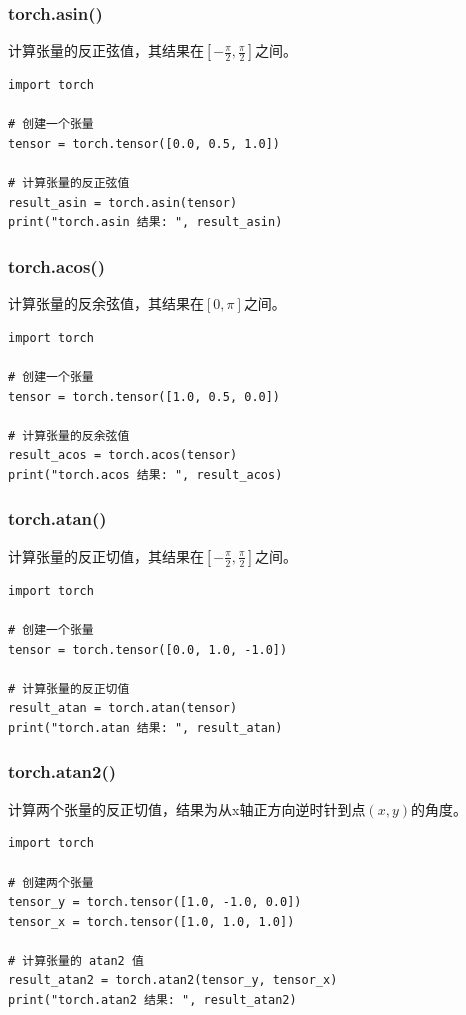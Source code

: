 \subsubsection{torch.asin()}
计算张量的反正弦值，其结果在$[-\frac{\pi}{2}, \frac{\pi}{2}]$之间。
\begin{lstlisting}[style=pythonstyle]
import torch

# 创建一个张量
tensor = torch.tensor([0.0, 0.5, 1.0])

# 计算张量的反正弦值
result_asin = torch.asin(tensor)
print("torch.asin 结果: ", result_asin)
\end{lstlisting}

\subsubsection{torch.acos()}
计算张量的反余弦值，其结果在$[0, \pi]$之间。
\begin{lstlisting}[style=pythonstyle]
import torch

# 创建一个张量
tensor = torch.tensor([1.0, 0.5, 0.0])

# 计算张量的反余弦值
result_acos = torch.acos(tensor)
print("torch.acos 结果: ", result_acos)
\end{lstlisting}

\subsubsection{torch.atan()}
计算张量的反正切值，其结果在$[-\frac{\pi}{2}, \frac{\pi}{2}]$之间。
\begin{lstlisting}[style=pythonstyle]
import torch

# 创建一个张量
tensor = torch.tensor([0.0, 1.0, -1.0])

# 计算张量的反正切值
result_atan = torch.atan(tensor)
print("torch.atan 结果: ", result_atan)
\end{lstlisting}

\subsubsection{torch.atan2()}
计算两个张量的反正切值，结果为从x轴正方向逆时针到点$(x, y)$的角度。
\begin{lstlisting}[style=pythonstyle]
import torch

# 创建两个张量
tensor_y = torch.tensor([1.0, -1.0, 0.0])
tensor_x = torch.tensor([1.0, 1.0, 1.0])

# 计算张量的 atan2 值
result_atan2 = torch.atan2(tensor_y, tensor_x)
print("torch.atan2 结果: ", result_atan2)
\end{lstlisting}

